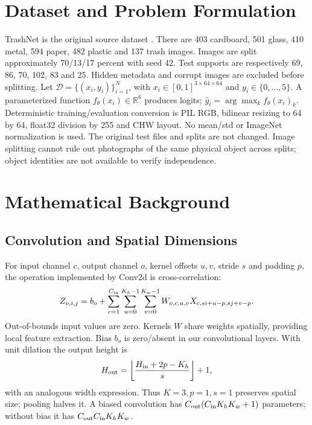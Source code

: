 \documentclass[conference]{IEEEtran}
\begin{document}
\section{Dataset and Problem Formulation}
TrashNet is the original source dataset \cite{trashnet}. There are 403 cardboard, 501 glass, 410 metal, 594 paper, 482 plastic and 137 trash images. Images are split approximately 70/13/17 percent with seed 42. Test supports are respectively 69, 86, 70, 102, 83 and 25. Hidden metadata and corrupt images are excluded before splitting. Let $\mathcal D=\{(x_i,y_i)\}_{i=1}^N$, with $x_i\in[0,1]^{3\times64\times64}$ and $y_i\in\{0,\ldots,5\}$. A parameterized function $f_\theta(x_i)\in\mathbb R^6$ produces logits; $\hat y_i=\arg\max_k f_\theta(x_i)_k$.
Deterministic training/evaluation conversion is PIL RGB, bilinear resizing to 64 by 64, float32 division by 255 and CHW layout. No mean/std or ImageNet normalization is used. The original test files and splits are not changed. Image splitting cannot rule out photographs of the same physical object across splits; object identities are not available to verify independence.

\section{Mathematical Background}
\subsection{Convolution and Spatial Dimensions}
For input channel $c$, output channel $o$, kernel offsets $u,v$, stride $s$ and padding $p$, the operation implemented by Conv2d is cross-correlation:
\begin{equation}
Z_{o,i,j}=b_o+\sum_{c=1}^{C_{\rm in}}\sum_{u=0}^{K_h-1}\sum_{v=0}^{K_w-1} W_{o,c,u,v}X_{c,si+u-p,sj+v-p}.
\end{equation}
Out-of-bounds input values are zero. Kernels $W$ share weights spatially, providing local feature extraction. Bias $b_o$ is zero/absent in our convolutional layers. With unit dilation the output height is
\begin{equation}
H_{\rm out}=\left\lfloor\frac{H_{\rm in}+2p-K_h}{s}\right\rfloor+1,
\end{equation}
with an analogous width expression. Thus $K=3,p=1,s=1$ preserves spatial size; pooling halves it. A biased convolution has $C_{\rm out}(C_{\rm in}K_hK_w+1)$ parameters; without bias it has $C_{\rm out}C_{\rm in}K_hK_w$.
\end{document}
